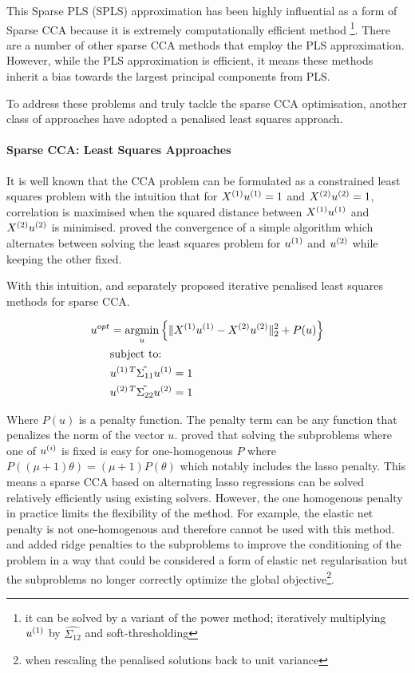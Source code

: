 This Sparse PLS (SPLS) approximation has been highly influential as a form of Sparse CCA because it is extremely computationally efficient method \footnote{it can be solved by a variant of the power method; iteratively multiplying $u^{(1)}$ by $\hat{\Sigma_{12}}$ and soft-thresholding}.
There are a number of other sparse CCA methods that employ the PLS approximation\citep{parkhomenko2009sparse, waaijenborg2008quantifying, lindenbaum2021l0}.
However, while the PLS approximation is efficient, it means these methods inherit a bias towards the largest principal components from PLS.

To address these problems and truly tackle the sparse CCA optimisation, another class of approaches have adopted a penalised least squares approach.

\paragraph{Sparse CCA: Least Squares Approaches}

It is well known that the CCA problem can be formulated as a constrained least squares problem with the intuition that
for \(X^{(1)} u^{(1)}=1\) and \(X^{(2)} u^{(2)}=1\), correlation is maximised when the squared distance
between \(X^{(1)} u^{(1)}\) and \(X^{(2)} u^{(2)}\) is minimised. \citep{golub1995canonical} proved the
convergence of a simple algorithm which alternates between solving the least squares problem for \(u^{(1)}\) and
\(u^{(2)}\) while keeping the other fixed.

With this intuition, \cite{wilms2015sparse} and \cite{mai2019iterative} separately proposed iterative penalised least
squares methods for sparse CCA\@.

\begin{align}
    \label{eq:mai}
    u^{opt} &= \underset{u}{\mathrm{argmin}} \left\{ \|X^{(1)}u^{(1)} - X^{(2)}u^{(2)}\|_2^2 + P(u) \right\} \\
    &\text{subject to:} \notag \\
    &u^{(1)\,T} \hat{\Sigma_{11}} u^{(1)}=1 \notag \\
    &u^{(2)\,T} \hat{\Sigma_{22}} u^{(2)}=1 \notag
\end{align}

Where \(P(u)\) is a penalty function.
The penalty term can be any function that penalizes the norm of the vector \(u\).
\citep{mai2019iterative} proved that solving the subproblems where one of $u^{(i)}$ is fixed is easy for one-homogenous $P$ where
\( P((\mu + 1)\theta) = (\mu + 1)P(\theta) \) which notably includes the lasso penalty.
This means a sparse CCA based
on alternating lasso regressions can be solved relatively efficiently using existing solvers.
However, the one homogenous penalty in practice limits the flexibility of the method.
For example, the elastic net penalty is not one-homogenous and therefore cannot be used with this method.
\citet{6556581} and \cite{Mullins2021} added ridge penalties to the subproblems to improve the conditioning of the problem in a way that could be considered a form of elastic net regularisation but the subproblems no longer correctly optimize the global objective\footnote{when rescaling the penalised solutions back to unit variance}.

